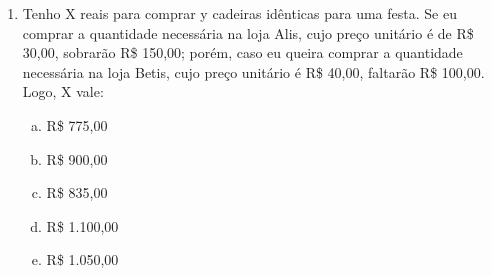 \documentclass[a4paper,14pt]{article}
\begin{document}
\begin{multicols}{2}
\begin{enumerate}
        \vspace{20cm}
        \item Tenho X reais para comprar y cadeiras idênticas para uma festa. Se eu comprar a quantidade necessária na loja Alis, cujo preço unitário é de R\$ 30,00, sobrarão R\$ 150,00; porém, caso eu queira comprar a quantidade necessária na loja Betis, cujo preço unitário é R\$ 40,00, faltarão R\$ 100,00. Logo, X vale:
        \begin{enumerate}[a)]
        	\item R\$ 775,00
        	\item R\$ 900,00
        	\item R\$ 835,00
        	\item R\$ 1.100,00
        	\item R\$ 1.050,00
        	\\ $~$ \\ $~$ \\ $~$ \\ $~$ \\ $~$ \\ $~$ \\ $~$ \\ $~$ \\ $~$ \\ $~$ \\ $~$ \\ $~$ \\ $~$ \\ $~$ \\ $~$ \\ $~$ \\ $~$ \\ $~$ \\ $~$ \\ $~$ \\ $~$ \\ $~$ \\ $~$ \\
        \end{enumerate}
        
    \end{enumerate}        
    \end{multicols}    
\end{document}
